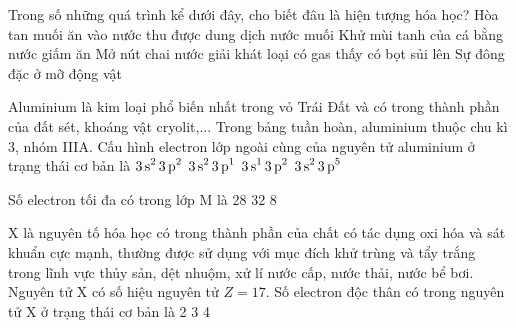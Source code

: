 \documentclass[11pt,a4paper]{article}
\begin{document}
\begin{ex}
Trong số những quá trình kể dưới đây, cho biết đâu là hiện tượng hóa học?
\choice
{Hòa tan muối ăn vào nước thu được dung dịch nước muối}
{\True Khử mùi tanh của cá bằng nước giấm ăn}
{Mở nút chai nước giải khát loại có gas thấy có bọt sủi lên}
{Sự đông đặc ở mỡ động vật}

\end{ex}
\begin{ex}
Aluminium là kim loại phổ biến nhất trong vỏ Trái Đất và có trong thành phần của đất sét, khoáng vật cryolit,... Trong bảng tuần hoàn, aluminium thuộc chu kì 3, nhóm IIIA. Cấu hình electron lớp ngoài cùng của nguyên tử aluminium ở trạng thái cơ bản là
\choice
{$\ce{3s^2 3p^2}$}
{\True $\ce{3s^2 3p^1}$}
{$\ce{3s^1 3p^2}$}
{$\ce{3s^2 3p^5}$}

\end{ex}
\begin{ex}
Số electron tối đa có trong lớp M là
\choice
{}
{28}
{32}
{8}

\end{ex}
\begin{ex}
X là nguyên tố hóa học có trong thành phần của chất có tác dụng oxi hóa và sát khuẩn cực mạnh, thường được sử dụng với mục đích khử trùng và tẩy trắng trong lĩnh vực thủy sản, dệt nhuộm, xử lí nước cấp, nước thải, nước bể bơi. Nguyên tử X có số hiệu nguyên tử $Z = 17$. Số electron độc thân có trong nguyên tử X ở trạng thái cơ bản là
\choice
{}
{2}
{3}
{4}

\end{ex}
\end{document}
